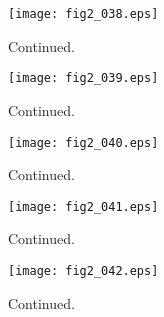 \documentclass[preprint]{aastex}
\begin{document}
\setcounter{figure}{1}
\begin{figure}[t]
\centering
\texttt{[image: fig2\_038.eps]}
\caption{
Continued. 
}
\label{Fig2}
\end{figure}
\clearpage



\setcounter{figure}{1}
\begin{figure}[t]
\centering
\texttt{[image: fig2\_039.eps]}
\caption{
Continued. 
}
\label{Fig2}
\end{figure}
\clearpage



\setcounter{figure}{1}
\begin{figure}[t]
\centering
\texttt{[image: fig2\_040.eps]}
\caption{
Continued. 
}
\label{Fig2}
\end{figure}
\clearpage



\setcounter{figure}{1}
\begin{figure}[t]
\centering
\texttt{[image: fig2\_041.eps]}
\caption{
Continued. 
}
\label{Fig2}
\end{figure}
\clearpage



\setcounter{figure}{1}
\begin{figure}[t]
\centering
\texttt{[image: fig2\_042.eps]}
\caption{
Continued. 
}
\label{Fig2}
\end{figure}
\clearpage
\end{document}
